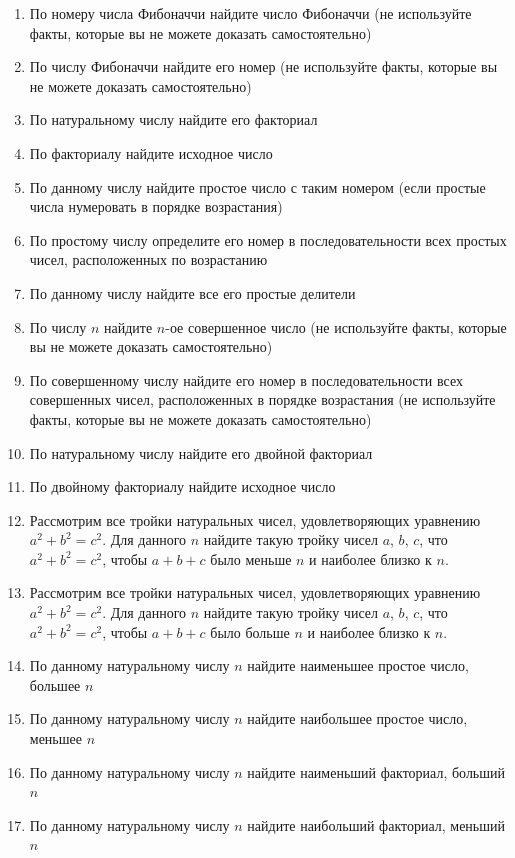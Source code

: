 \begin{enumerate}
	\item По номеру числа Фибоначчи найдите число Фибоначчи (не используйте факты, которые вы не можете доказать самостоятельно)
	\item По числу Фибоначчи найдите его номер (не используйте факты, которые вы не можете доказать самостоятельно)
	\item По натуральному числу найдите его факториал
	\item По факториалу найдите исходное число
        \item По данному числу найдите простое число с таким номером (если простые числа нумеровать в порядке возрастания)
	\item По простому числу определите его номер в последовательности всех простых чисел, расположенных по возрастанию
	\item По данному числу найдите все его простые делители
	\item По числу $n$ найдите $n$-ое совершенное число (не используйте факты, которые вы не можете доказать самостоятельно)
	\item По совершенному числу найдите его номер в последовательности всех совершенных чисел, расположенных в порядке возрастания
                   (не используйте факты, которые вы не можете доказать самостоятельно)
	\item По натуральному числу найдите его двойной факториал
	\item По двойному факториалу найдите исходное число
	\item Рассмотрим все тройки натуральных чисел, удовлетворяющих уравнению $a^2+b^2=c^2$. Для данного $n$ найдите такую 
		тройку чисел $a$, $b$, $c$, что $a^2+b^2=c^2$, чтобы $a+b+c$ было меньше $n$ и наиболее близко к $n$.
	\item Рассмотрим все тройки натуральных чисел, удовлетворяющих уравнению $a^2+b^2=c^2$. Для данного $n$ найдите такую 
		тройку чисел $a$, $b$, $c$, что $a^2+b^2=c^2$, чтобы $a+b+c$ было больше $n$ и наиболее близко к $n$.
	\item По данному натуральному числу $n$ найдите наименьшее простое число, большее $n$
	\item По данному натуральному числу $n$ найдите наибольшее простое число, меньшее $n$
	\item По данному натуральному числу $n$ найдите наименьший факториал, больший $n$
	\item По данному натуральному числу $n$ найдите наибольший факториал, меньший $n$

\end{enumerate}
